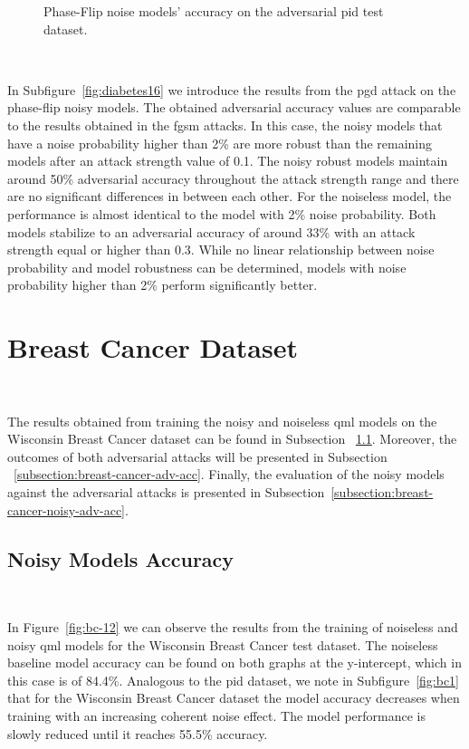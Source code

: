 \begin{figure}[!h]
  \caption{Phase-Flip noise models' accuracy on the adversarial \ac{pid} test dataset.}
  \label{fig:diabetes-1516}
\end{figure} \

In Subfigure~\ref{fig:diabetes16} we introduce the results from the \ac{pgd}
attack on the phase-flip noisy models. The obtained adversarial accuracy
values are comparable to the results obtained in the \ac{fgsm} attacks.
In this case, the noisy models that have a noise probability higher than
2\% are more robust than the remaining models after an attack
strength value of 0.1. The noisy robust models maintain around 50\%
adversarial accuracy throughout the attack strength range and there
are no significant differences in between each other. For the noiseless
model, the performance is almost identical to the model with 2\% noise
probability. Both models stabilize to an adversarial accuracy of around
33\% with an attack strength equal or higher than 0.3. While no linear
relationship between noise probability and model robustness can be
determined, models with noise probability higher than 2\% perform
significantly better. \

\section{Breast Cancer Dataset}\label{section:breast-cancer-eval} \

The results obtained from training the noisy and noiseless
\ac{qml} models on the Wisconsin Breast Cancer dataset can be found in Subsection
~\ref{subsection:breast-cancer-noisy-acc}. Moreover, the outcomes
of both adversarial attacks will be presented in Subsection
~\ref{subsection:breast-cancer-adv-acc}. Finally, the evaluation
of the noisy models against the adversarial attacks is
presented in Subsection~\ref{subsection:breast-cancer-noisy-adv-acc}. \

\subsection{Noisy Models Accuracy}\label{subsection:breast-cancer-noisy-acc} \

In Figure~\ref{fig:bc-12} we can observe the results
from the training of noiseless and noisy \ac{qml} models
for the Wisconsin Breast Cancer test dataset. The noiseless baseline model accuracy
can be found on both graphs at the y-intercept, which in
this case is of 84.4\%. Analogous to the \ac{pid} dataset, we note
in Subfigure~\ref{fig:bc1} that for the Wisconsin Breast Cancer
dataset the model accuracy decreases when training
with an increasing coherent noise effect. The model performance
is slowly reduced until it reaches 55.5\% accuracy. \


